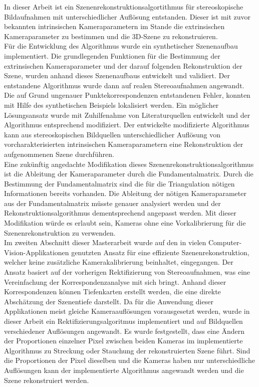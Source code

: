 
In dieser Arbeit ist ein Szenenrekonstruktionsalgortithmus für stereoskopische Bildaufnahmen mit unterschiedlicher Auflösung entstanden. Dieser ist mit zuvor bekannten intrinsischen Kameraparametern im Stande die extrinsischen Kameraparameter zu bestimmen und die 3D-Szene zu rekonstruieren. \\

Für die Entwicklung des Algorithmus wurde ein synthetischer Szenenaufbau implementiert. Die grundlegenden Funktionen für die Bestimmung der extrinsischen Kameraparameter und der darauf folgenden Rekonstruktion der Szene, wurden anhand dieses Szenenaufbaus entwickelt und validiert. Der entstandene Algorithmus wurde dann auf realen Stereoaufnahmen angewandt. Die auf Grund ungenauer Punktekorrespondenzen entstandenen Fehler, konnten mit Hilfe des synthetischen Beispiels lokalisiert werden. Ein möglicher Lösungsansatz wurde mit Zuhilfenahme von Literaturquellen entwickelt und der Algorithmus entsprechend modifiziert. Der entwickelte modifizierte Algorithmus kann aus stereoskopischen Bildquellen unterschiedlicher Auflösung von vorcharakterisierten intrinsischen Kameraparametern eine Rekonstruktion der aufgenommenen Szene durchführen.  \\

Eine zukünftig angedachte Modifikation dieses Szenenrekonstruktionsalgorithmus ist die Ableitung der Kameraparameter durch die Fundamentalmatrix. Durch die Bestimmung der Fundamentalmatrix sind die für die Triangulation nötigen Informationen bereits vorhanden. Die Ableitung der nötigen Kameraparameter aus der Fundamentalmatrix müsste genauer analysiert werden und der Rekonstruktionsalgorithmus dementsprechend angepasst werden. Mit dieser Modifikation würde es erlaubt sein, Kameras ohne eine Vorkalibrierung für die Szenenrekonstruktion zu verwenden. \\

Im zweiten Abschnitt dieser Masterarbeit wurde auf den in vielen Computer-Vision-Applikationen genutzten Ansatz für eine effiziente Szenenrekonstruktion, welcher keine zusätzliche Kamerakalibrierung beinhaltet, eingegangen. Der Ansatz basiert auf der vorherigen Rektifizierung von Stereoaufnahmen, was eine Vereinfachung der Korrespondenzanalyse mit sich bringt. Anhand dieser Korrespondenzen können Tiefenkarten erstellt werden, die eine direkte Abschätzung der Szenentiefe darstellt. Da für die Anwendung dieser Applikationen meist gleiche Kameraauflösungen vorausgesetzt werden, wurde in dieser Arbeit ein Rektifizierungsalgoritmus implementiert und auf Bildquellen verschiedener Auflösungen angewandt. Es wurde festgestellt, dass eine Ändern der Proportionen einzelner Pixel zwischen beiden Kameras im implementierte Algorithmus zu Streckung oder Stauchung der rekonstruierten Szene führt. Sind die Proportionen der Pixel dieselben und die Kameras haben nur unterschiedliche Auflösungen kann der implementierte Algorithmus angewandt werden und die Szene rekonstruiert werden. \\

